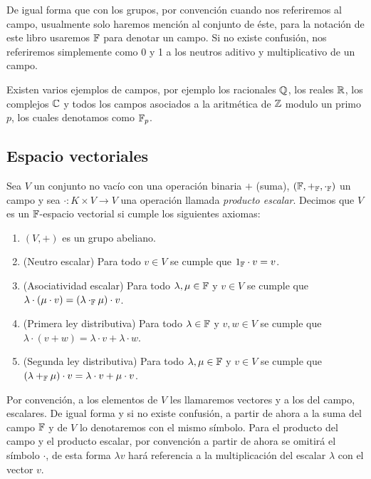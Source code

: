 De igual forma que con los grupos, por convención cuando nos referiremos al campo, usualmente solo haremos mención al conjunto de éste, para la notación de este libro usaremos $\mathbb{F}$ para denotar un campo. Si no existe confusión, nos referiremos simplemente como 0 y 1 a los neutros aditivo y multiplicativo de un campo.

Existen varios ejemplos de campos, por ejemplo los racionales $\mathbb{Q}$, los reales $\mathbb{R}$, los complejos $\mathbb{C}$ y todos los campos asociados a la aritmética de $\mathbb{Z}$ modulo un primo $p$, los cuales denotamos como $\mathbb{F}_p$.

\subsection{Espacio vectoriales}

\begin{defi}
  Sea $V$ un conjunto no vacío con una operación binaria $+$ (suma), $(\mathbb{F}, +_{\mathbb{F}}, \cdot_{\mathbb{F}} )$ un campo y sea $\cdot\colon K \times V \to V$ una operación llamada \emph{producto escalar}. Decimos que $V$ es un $\mathbb{F}$-espacio vectorial si cumple los siguientes axiomas:
  \begin{enumerate}
    \item $(V, +)$ es un grupo abeliano.
    \item (Neutro escalar) Para todo $v \in V$ se cumple que $1_{\mathbb{F}} \cdot v = v$.
    \item (Asociatividad escalar) Para todo $\lambda, \mu \in \mathbb{F}$ y $v \in V$ se cumple que $\lambda \cdot (\mu \cdot v) = (\lambda \cdot_{\mathbb{F}} \mu)  \cdot v$.
    \item (Primera ley distributiva) Para todo $\lambda \in \mathbb{F}$ y $v,w \in V$ se cumple que $\lambda \cdot (v + w) = \lambda \cdot v + \lambda \cdot w$.
    \item (Segunda ley distributiva) Para todo $\lambda, \mu \in \mathbb{F}$ y $v\in V$ se cumple que $(\lambda +_{\mathbb{F}} \mu)\cdot v = \lambda \cdot v + \mu \cdot v$.
  \end{enumerate}
\end{defi}


Por convención, a los elementos de $V$ les llamaremos vectores y a los del campo, escalares. De igual forma y si no existe confusión, a partir de ahora a la suma del campo $\mathbb{F}$ y de $V$ lo denotaremos con el mismo símbolo. Para el producto del campo y el producto escalar, por convención a partir de ahora se omitirá el símbolo $\cdot$, de esta forma $\lambda v$ hará referencia a la multiplicación del escalar $\lambda$ con el vector $v$.

